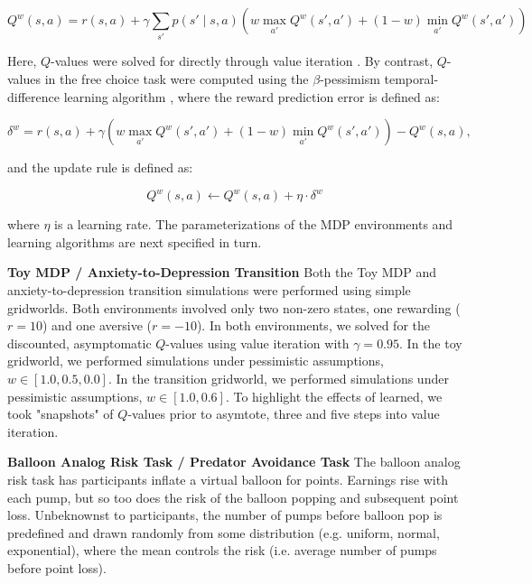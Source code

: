 \documentclass[11pt]{article} %
\begin{document}
\begin{equation*}
Q^w(s,a) = r(s,a) + \gamma \sum_{s'} p(s' \mid s,a) \left( w \max_{a'} Q^w(s',a') + (1 - w) \min_{a'} Q^w(s',a') \right)
\end{equation*}

Here, $Q$-values were solved for directly through value iteration \citep{SuttonBarto2018}. By contrast, $Q$-values in the free choice task were computed using the $\beta$-pessimism temporal-difference learning algorithm \citep{Gaskett2003}, where the reward prediction error is defined as:

\begin{equation*}
\delta^w = r(s,a) + \gamma \left( w \max_{a'} Q^w(s',a') + (1 - w) \min_{a'} Q^w(s',a') \right) - Q^w(s,a), 
\end{equation*}

and the update rule is defined as:

\begin{equation*}
Q^w(s,a) \leftarrow Q^w(s,a) + \eta \cdot \delta^w
\end{equation*}

where $\eta$ is a learning rate. The parameterizations of the MDP environments and learning algorithms are next specified in turn.

\textbf{Toy MDP / Anxiety-to-Depression Transition} Both the Toy MDP and anxiety-to-depression transition simulations were performed using simple gridworlds. Both environments involved only two non-zero states, one rewarding ($r=10$) and one aversive ($r=-10$). In both environments, we solved for the discounted, asymptomatic $Q$-values using value iteration with $\gamma = 0.95$. In the toy gridworld, we performed simulations under pessimistic assumptions, $w \in [1.0, 0.5, 0.0]$. In the transition gridworld, we performed simulations under pessimistic assumptions, $w \in [1.0, 0.6]$. To highlight the effects of learned, we took "snapshots" of $Q$-values prior to asymtote, three and five steps into value iteration. 

\textbf{Balloon Analog Risk Task / Predator Avoidance Task} The balloon analog risk task \citep{Lejuez2002} has participants inflate a virtual balloon for points. Earnings rise with each pump, but so too does the risk of the balloon popping and subsequent point loss. Unbeknownst to participants, the number of pumps before balloon pop is predefined and drawn randomly from some distribution (e.g. uniform, normal, exponential), where the mean controls the risk (i.e. average number of pumps before point loss). 
\end{document}
